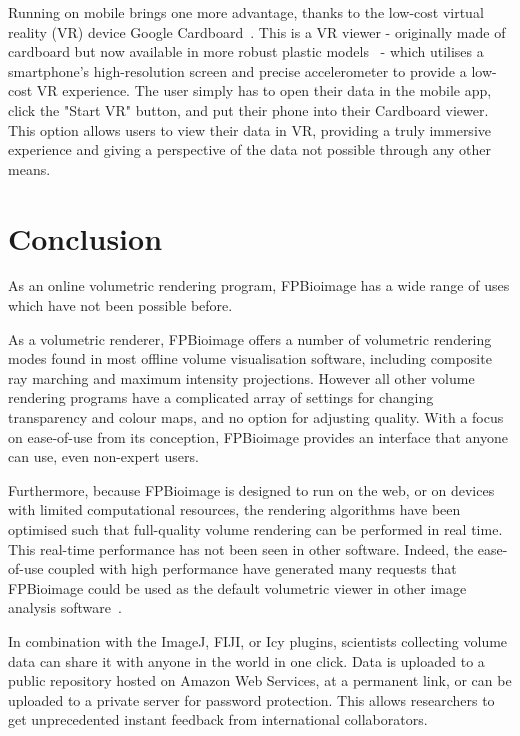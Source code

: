 Running on mobile brings one more advantage, thanks to the low-cost virtual reality (VR) device Google Cardboard~\cite{cardboard}. 
This is a VR viewer - originally made of cardboard but now available in more robust plastic models~\cite{get2018cardboard} - which utilises a smartphone's high-resolution screen and precise accelerometer to provide a low-cost VR experience. 
The user simply has to open their data in the mobile app, click the "Start VR" button, and put their phone into their Cardboard viewer. 
This option allows users to view their data in VR, providing a truly immersive experience and giving a perspective of the data not possible through any other means. 



\section{Conclusion} %
As an online volumetric rendering program, FPBioimage has a wide range of uses which have not been possible before. 

As a volumetric renderer, FPBioimage offers a number of volumetric rendering modes found in most offline volume visualisation software, including composite ray marching and maximum intensity projections. 
However all other volume rendering programs have a complicated array of settings for changing transparency and colour maps, and no option for adjusting quality.
With a focus on ease-of-use from its conception, FPBioimage provides an interface that anyone can use, even non-expert users. 

Furthermore, because FPBioimage is designed to run on the web, or on devices with limited computational resources, the rendering algorithms have been optimised such that full-quality volume rendering can be performed in real time. 
This real-time performance has not been seen in other software. 
Indeed, the ease-of-use coupled with high performance have generated many requests that FPBioimage could be used as the default volumetric viewer in other image analysis software~\cite{twitter2018fantm}. 

In combination with the ImageJ, FIJI, or Icy plugins, scientists collecting volume data can share it with anyone in the world in one click. 
Data is uploaded to a public repository hosted on Amazon Web Services, at a permanent link, or can be uploaded to a private server for password protection. 
This allows researchers to get unprecedented instant feedback from international collaborators. 

